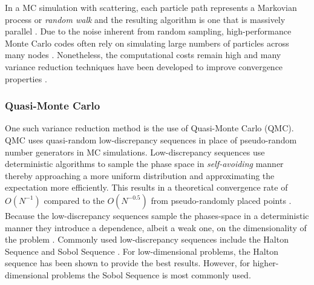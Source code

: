In a MC simulation with scattering, each particle path represents a Markovian process or \textit{random walk} and the resulting algorithm is one that is massively parallel \cite{Carter1975, Kroese2011, willert2012hybrid}. Due to the noise inherent from random sampling, high-performance Monte Carlo codes often rely on simulating large numbers of particles across many nodes \cite{Pereira2013}. Nonetheless, the computational costs remain high and many variance reduction techniques have been developed to improve convergence properties \cite{McClarren2018}.



\subsubsection{Quasi-Monte Carlo}

One such variance reduction method is the use of Quasi-Monte Carlo (QMC). QMC  uses quasi-random low-discrepancy sequences in place of pseudo-random number generators in MC simulations. Low-discrepancy sequences use deterministic algorithms to sample the phase space in \textit{self-avoiding}  manner thereby approaching a more uniform distribution and approximating the expectation more efficiently. This results in a theoretical convergence rate of $O(N^{-1})$ compared to the $O(N^{-0.5})$ from pseudo-randomly placed points \cite{Palluotto2019}.  Because the low-discrepancy sequences sample the phases-space in a deterministic manner they introduce a dependence, albeit a weak one, on the dimensionality of the problem \cite{Hickernell2002}. Commonly used low-discrepancy sequences include the Halton Sequence and Sobol Sequence \cite{Niederreiter1992}. For low-dimensional problems, the Halton sequence has been shown to provide the best results. However, for higher-dimensional problems the Sobol Sequence is most commonly used.

